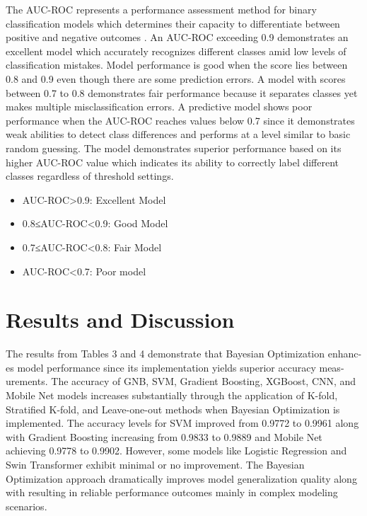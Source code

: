 \documentclass[runningheads]{llncs}
\begin{document}
The AUC-ROC represents a performance assessment method for binary classification models which determines their capacity to differentiate between positive and negative outcomes \cite{chen2022}. An AUC-ROC exceeding 0.9 demonstrates an excellent model which accurately recognizes different classes amid low levels of classification mistakes. Model performance is good when the score lies between 0.8 and 0.9 even though there are some prediction errors. A model with scores between 0.7 to 0.8 demonstrates fair performance because it separates classes yet makes multiple misclassification errors. A predictive model shows poor performance when the AUC-ROC reaches values below 0.7 since it demonstrates weak abilities to detect class differences and performs at a level similar to basic random guessing.  The model demonstrates superior performance based on its higher AUC-ROC value which indicates its ability to correctly label different classes regardless of threshold settings. 
\begin{itemize}
    \item AUC-ROC>0.9: Excellent Model
    \item 0.8≤AUC-ROC<0.9: Good Model
    \item 0.7≤AUC-ROC<0.8: Fair Model
    \item AUC-ROC<0.7: Poor model
\end{itemize}


\section{Results and Discussion }

The results from Tables 3 and 4 demonstrate that Bayesian Optimization enhanc-es model performance since its implementation yields superior accuracy meas-urements. The accuracy of GNB, SVM, Gradient Boosting, XGBoost, CNN, and Mobile Net models increases substantially through the application of K-fold, Stratified K-fold, and Leave-one-out methods when Bayesian Optimization is implemented. The accuracy levels for SVM improved from 0.9772 to 0.9961 along with Gradient Boosting increasing from 0.9833 to 0.9889 and Mobile Net achieving 0.9778 to 0.9902. However, some models like Logistic Regression and Swin Transformer exhibit minimal or no improvement. The Bayesian Optimization approach dramatically improves model generalization quality along with resulting in reliable performance outcomes mainly in complex modeling scenarios.
\end{document}
